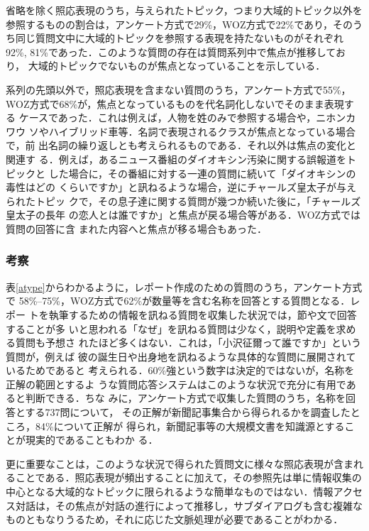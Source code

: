 \documentclass[japanese]{jnlp_1.4}
\begin{document}
省略を除く照応表現のうち，与えられたトピック，つまり大域的トピック以外を
参照するものの割合は，アンケート方式で29\%，WOZ方式で22\%であり，そのう
ち同じ質問文中に大域的トピックを参照する表現を持たないものがそれぞれ
92\%, 81\%であった．このような質問の存在は質問系列中で焦点が推移しており，
大域的トピックでないものが焦点となっていることを示している．

系列の先頭以外で，照応表現を含まない質問のうち，アンケート方式で55\%，
WOZ方式で68\%が，焦点となっているものを代名詞化しないでそのまま表現する
ケースであった．これは例えば，人物を姓のみで参照する場合や，ニホンカワウ
ソやハイブリッド車等．名詞で表現されるクラスが焦点となっている場合で，前
出名詞の繰り返しとも考えられるものである．それ以外は焦点の変化と関連す
る．例えば，あるニュース番組のダイオキシン汚染に関する誤報道をトピックと
した場合に，その番組に対する一連の質問に続いて「ダイオキシンの毒性はどの
くらいですか」と訊ねるような場合，逆にチャールズ皇太子が与えられたトピッ
クで，その息子達に関する質問が幾つか続いた後に，「チャールズ皇太子の長年
の恋人とは誰ですか」と焦点が戻る場合等がある．WOZ方式では質問の回答に含
まれた内容へと焦点が移る場合もあった．


\subsubsection{考察}

表\ref{atype}からわかるように，レポート作成のための質問のうち，アンケート方式で
58\%--75\%，WOZ方式で62\%が数量等を含む名称を回答とする質問となる．レポー
トを執筆するための情報を訊ねる質問を収集した状況では，節や文で回答することが多
いと思われる「なぜ」を訊ねる質問は少なく，説明や定義を求める質問も予想さ
れたほど多くはない．これは，「小沢征爾って誰ですか」という質問が，例えば
彼の誕生日や出身地を訊ねるような具体的な質問に展開されているためであると
考えられる．60\%強という数字は決定的ではないが，名称を正解の範囲とするよ
うな質問応答システムはこのような状況で充分に有用であると判断できる．ちな
みに，アンケート方式で収集した質問のうち，名称を回答とする737問について，
その正解が新聞記事集合から得られるかを調査したところ，84\%について正解が
得られ，新聞記事等の大規模文書を知識源とすることが現実的であることもわか
る．

更に重要なことは，このような状況で得られた質問文に様々な照応表現が含まれ
ることである．照応表現が頻出することに加えて，その参照先は単に情報収集の
中心となる大域的なトピックに限られるような簡単なものではない．情報アクセ
ス対話は，その焦点が対話の進行によって推移し，サブダイアログも含む複雑な
ものともなりうるため，それに応じた文脈処理が必要であることがわかる．
\end{document}
